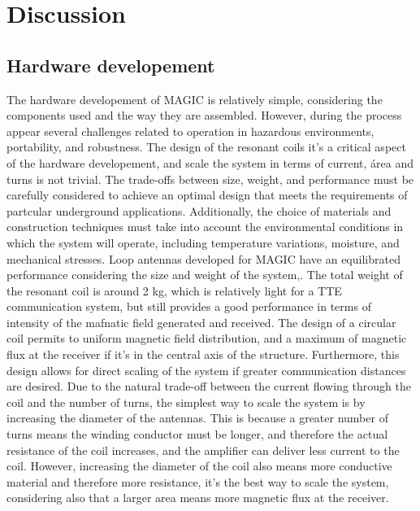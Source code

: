 \chapter{Discussion}\label{ch:discussion}

\section{Hardware developement}
 The hardware developement of MAGIC is relatively simple, considering the components used and the way they are assembled. However, during the process appear several challenges related to operation in hazardous environments, portability, and robustness.
 \newp
    The design of the resonant coils it's a critical aspect of the hardware developement, and scale the system in terms of current, área and turns is not trivial. The trade-offs between size, weight, and performance must be carefully considered to achieve an optimal design that meets the requirements of partcular underground applications.
 \newp
    Additionally, the choice of materials and construction techniques must take into account the environmental conditions in which the system will operate, including temperature variations, moisture, and mechanical stresses.
\newp
Loop antennas developed for MAGIC have an equilibrated performance considering the size and weight of the system,. The total weight of the resonant coil is around 2 kg, which is relatively light for a TTE communication system, but still provides a good performance in terms of intensity of the mafnatic field generated and received. The design of a circular coil permits to uniform magnetic field distribution, and a maximum of magnetic flux at the receiver if it's in the central axis of the structure. Furthermore, this design allows for direct scaling of the system if greater communication distances are desired. Due to the natural trade-off between the current flowing through the coil and the number of turns, the simplest way to scale the system is by increasing the diameter of the antennas. This is because a greater number of turns means the winding conductor must be longer, and therefore the actual resistance of the coil increases, and the amplifier can deliver less current to the coil. However, increasing the diameter of the coil also means more conductive material and therefore more resistance, it's the best way to scale the system, considering also that a larger area means more magnetic flux at the receiver.


